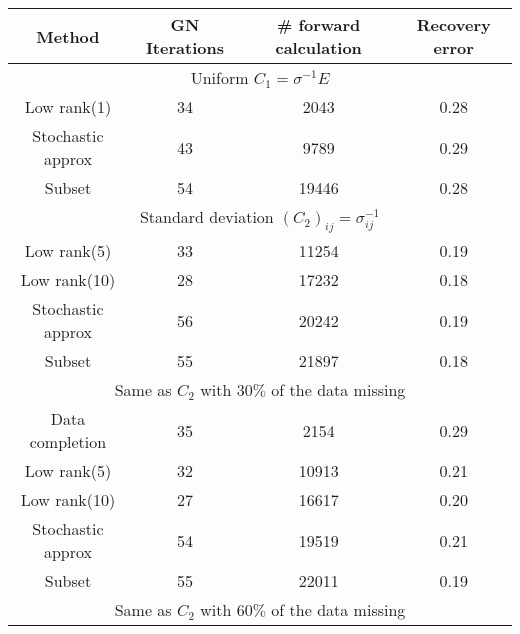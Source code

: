 \documentclass[12pt]{article}
\begin{document}
\begin{table}
\begin{center}
\begin{tabular}{|cccc|}
\hline
Method                     & GN Iterations & \# forward calculation & Recovery error \\
\hline
\multicolumn{4}{|c|}{ Uniform $C_{1} = \sigma^{-1} E$} \\
\hline
Low rank(1)            &         34                   &              2043                       &        0.28       \\
Stochastic approx  &         43                  &             9789                        &        0.29      \\
Subset                      &        54                   &            19446                        &       0.28        \\
\hline
\multicolumn{4}{|c|}{Standard deviation $(C_{2})_{ij} = \sigma_{ij}^{-1}  $} \\
\hline
Low rank(5)            &         33            &              11254                   &        0.19       \\
Low rank(10)          &         28           &              17232                    &        0.18       \\
Stochastic approx  &       56             &             20242                    &      0.19         \\
Subset                     &       55            &              21897                    &       0.18        \\
\hline
\multicolumn{4}{|c|}{Same as $C_{2}$ with $30\%$ of the data missing} \\
\hline
Data completion    &       35                &             2154                        &     0.29          \\
Low rank(5)            &        32            &              10913                   &        0.21       \\
Low rank(10)          &         27           &              16617                    &        0.20       \\
Stochastic approx  &       54             &             19519                    &      0.21         \\
Subset                     &       55            &              22011                    &       0.19        \\
\hline
\multicolumn{4}{|c|}{Same as $C_{2}$ with $60\%$ of the data missing} \\

\end{tabular}
\end{center}
\end{table}
\end{document}
